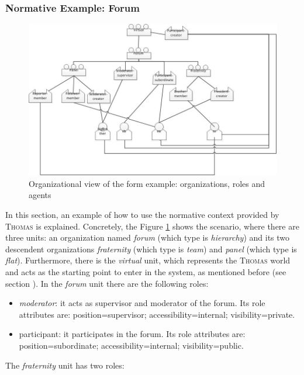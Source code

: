 \begin{enumerate}
\subsubsection{Normative Example: Forum}


\begin{figure}[hbtp]
\includegraphics[width=1\textwidth]{Thomas/images/ejemploNormas.jpg}
\caption{Organizational view of the form example: organizations, roles and agents}
\label{fig:normExample}
\end{figure}

In this section,  an example of how to use the normative context provided by \textsc{Thomas} is explained. Concretely,  the Figure \ref{fig:normExample} shows the scenario, where there are three units:  an organization named \textit{forum} (which type is \textit{hierarchy}) and its two descendent organizations \textit{fraternity} (which type is \textit{team}) and \textit{panel} (which type is \textit{flat}). Furthermore, there is the \textit{virtual} unit, which represents the \textsc{Thomas} world  and acts as the starting point to enter in the system, as mentioned before (see section \label{sec:unitsinthomas}). In the \textit{forum} unit there are the following roles:
\begin{itemize}
\item \textit{moderator}: it acts as supervisor and moderator of the forum. Its role attributes are: position=supervisor; accessibility=internal; visibility=private.
\item participant: it participates in the forum.  Its role attributes are: position=subordinate; accessibility=internal; visibility=public.
\end{itemize}

The \textit{fraternity} unit has two roles:


\end{enumerate}
